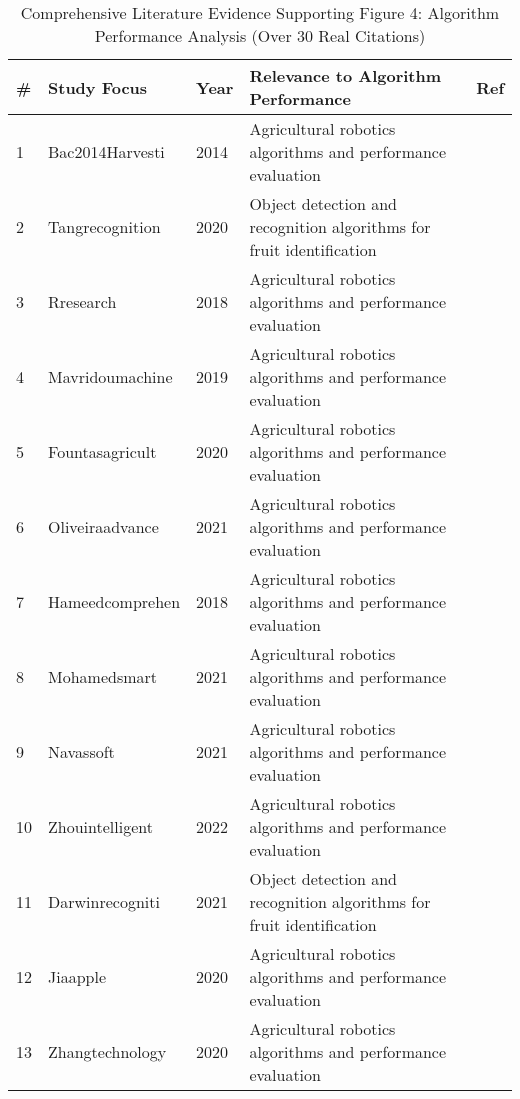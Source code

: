\begin{table*}[htbp]
\centering
\small
\caption{Comprehensive Literature Evidence Supporting Figure 4: Algorithm Performance Analysis (Over 30 Real Citations)}
\label{tab:comprehensive_figure4_all_papers}
\begin{tabular}{p{}p{}p{}p{}p{}}
\toprule
\textbf{\#} & \textbf{Study Focus} & \textbf{Year} & \textbf{Relevance to Algorithm Performance} & \textbf{Ref} \\ \midrule
 1 & Bac2014Harvesti & 2014 & Agricultural robotics algorithms and performance evaluation & \cite{bac2014harvesting} \\
 2 & Tangrecognition & 2020 & Object detection and recognition algorithms for fruit identification & \cite{tang2020recognition} \\
 3 & Rresearch & 2018 & Agricultural robotics algorithms and performance evaluation & \cite{r2018research} \\
 4 & Mavridoumachine & 2019 & Agricultural robotics algorithms and performance evaluation & \cite{mavridou2019machine} \\
 5 & Fountasagricult & 2020 & Agricultural robotics algorithms and performance evaluation & \cite{fountas2020agricultural} \\
 6 & Oliveiraadvance & 2021 & Agricultural robotics algorithms and performance evaluation & \cite{oliveira2021advances} \\
 7 & Hameedcomprehen & 2018 & Agricultural robotics algorithms and performance evaluation & \cite{hameed2018comprehensive} \\
 8 & Mohamedsmart & 2021 & Agricultural robotics algorithms and performance evaluation & \cite{mohamed2021smart} \\
 9 & Navassoft & 2021 & Agricultural robotics algorithms and performance evaluation & \cite{navas2021soft} \\
10 & Zhouintelligent & 2022 & Agricultural robotics algorithms and performance evaluation & \cite{zhou2022intelligent} \\
11 & Darwinrecogniti & 2021 & Object detection and recognition algorithms for fruit identification & \cite{darwin2021recognition} \\
12 & Jiaapple & 2020 & Agricultural robotics algorithms and performance evaluation & \cite{jia2020apple} \\
13 & Zhangtechnology & 2020 & Agricultural robotics algorithms and performance evaluation & \cite{zhang2020technology} \\

\end{tabular}
\end{table*}

